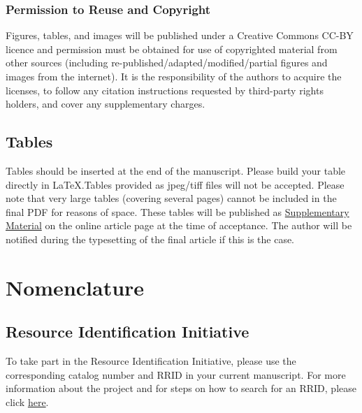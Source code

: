 \documentclass[utf8]{frontiersSCNS} %
\begin{document}
\subsubsection{Permission to Reuse and Copyright}
Figures, tables, and images will be published under a Creative Commons CC-BY licence and permission must be obtained for use of copyrighted material from other sources (including re-published/adapted/modified/partial figures and images from the internet). It is the responsibility of the authors to acquire the licenses, to follow any citation instructions requested by third-party rights holders, and cover any supplementary charges.

\subsection{Tables}
Tables should be inserted at the end of the manuscript. Please build your table directly in LaTeX.Tables provided as jpeg/tiff files will not be accepted. Please note that very large tables (covering several pages) cannot be included in the final PDF for reasons of space. These tables will be published as \href{http://home.frontiersin.org/about/author-guidelines#SupplementaryMaterial}{Supplementary Material} on the online article page at the time of acceptance. The author will be notified during the typesetting of the final article if this is the case. 

\section{Nomenclature}

\subsection{Resource Identification Initiative}
To take part in the Resource Identification Initiative, please use the corresponding catalog number and RRID in your current manuscript. For more information about the project and for steps on how to search for an RRID, please click \href{http://www.frontiersin.org/files/pdf/letter_to_author.pdf}{here}.
\end{document}
